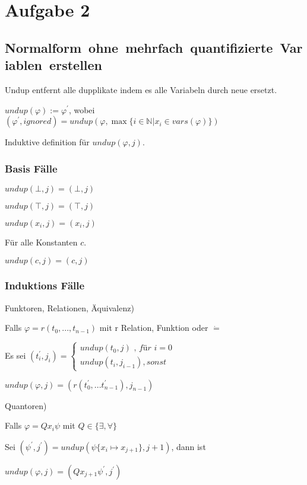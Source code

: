 \section*{Aufgabe 2}

\subsection*{\mbox{Normalform ohne mehrfach quantifizierte Variablen erstellen}}
Undup entfernt alle dupplikate indem es alle Variabeln durch neue ersetzt.

$undup(\varphi) := \varphi^\prime $, wobei $ (\varphi^\prime,ignored) = undup(\varphi,\max\limits{\{ i \in \mathbb{N} | x_i \in vars(\varphi)\}})$

\hfill

Induktive definition für $undup(\varphi,j)$.

\subsubsection*{Basis Fälle}

$undup(\bot,j) = (\bot , j)$

$undup(\top,j) = (\top, j)$

$undup(x_i,j) = 	(x_i, j)$

Für alle Konstanten $c$.

$undup(c,j) = (c,j)$

\subsubsection*{Induktions Fälle}


Funktoren, Relationen, Äquivalenz) 

\hfill

Falls $\varphi = r(t_0,...,t_{n-1})$ mit r Relation, Funktion oder $\dot=$ 

Es sei $(t^\prime_i,j_i) = \begin{cases}
	undup(t_0,j) \textit{ , für } i=0 \\
	undup(t_i,j_{i-1}) , sonst
\end{cases}$

$undup(\varphi,j) = (r(t^\prime_0,...t^\prime_{n-1}),j_{n-1})$

\hfill

Quantoren)

\hfill

Falls $\varphi = Q x_i \psi$ mit $Q \in \{\exists,\forall\}$

Sei $(\psi^\prime,j^\prime) = undup(\psi\{x_i \mapsto x_{j+1}\},j+1)$, dann ist

$undup(\varphi, j) = 	(Q x_{j+1} \psi^\prime , j^\prime)$